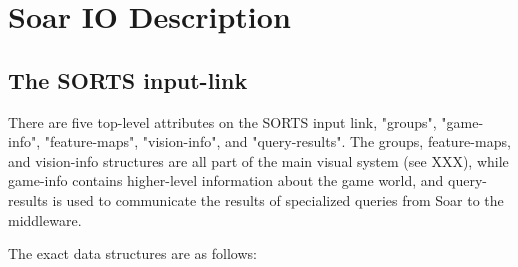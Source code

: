 \documentclass{report}
\begin{document}
\section{Soar IO Description}

\subsection{The SORTS input-link}

There are five top-level attributes on the SORTS input link, "groups", "game-info", "feature-maps", "vision-info", and "query-results". The groups, feature-maps, and vision-info structures are all part of the main visual system (see XXX), while game-info contains higher-level information about the game world, and query-results is used to communicate the results of specialized queries from Soar to the middleware.

The exact data structures are as follows:
\end{document}
